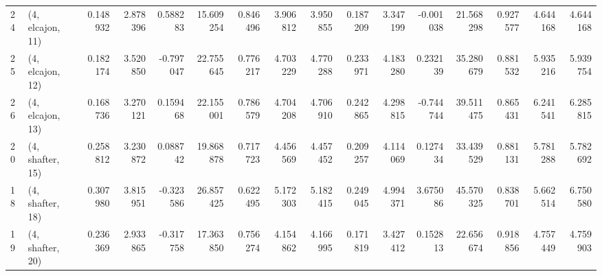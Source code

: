 \begin{tabular}{llrrrrrrrrrrrrrr}
24 &  (4, elcajon, 11) &   0.148932 &  2.878396 &  0.588283 &  15.609254 &  0.846496 &   3.906812 &  3.950855 &  0.187209 &  3.347199 & -0.001038 &   21.568298 &  0.927577 &   4.644168 &   4.644168 \\
25 &  (4, elcajon, 12) &   0.182174 &  3.520850 & -0.797047 &  22.755645 &  0.776217 &   4.703229 &  4.770288 &  0.233971 &  4.183280 &  0.232139 &   35.280679 &  0.881532 &   5.935216 &   5.939754 \\
26 &  (4, elcajon, 13) &   0.168736 &  3.270121 &  0.159468 &  22.155001 &  0.786579 &   4.704208 &  4.706910 &  0.242865 &  4.298815 & -0.744744 &   39.511475 &  0.865431 &   6.241541 &   6.285815 \\
20 &  (4, shafter, 15) &   0.258812 &  3.230872 &  0.088742 &  19.868878 &  0.717723 &   4.456569 &  4.457452 &  0.209257 &  4.114069 &  0.127434 &   33.439529 &  0.881131 &   5.781288 &   5.782692 \\
18 &  (4, shafter, 18) &   0.307980 &  3.815951 & -0.323586 &  26.857425 &  0.622495 &   5.172303 &  5.182415 &  0.249045 &  4.994371 &  3.675086 &   45.570325 &  0.838701 &   5.662514 &   6.750580 \\
19 &  (4, shafter, 20) &   0.236369 &  2.933865 & -0.317758 &  17.363850 &  0.756274 &   4.154862 &  4.166995 &  0.171819 &  3.427412 &  0.152813 &   22.656674 &  0.918856 &   4.757449 &   4.759903 \\
\bottomrule
\end{tabular}
